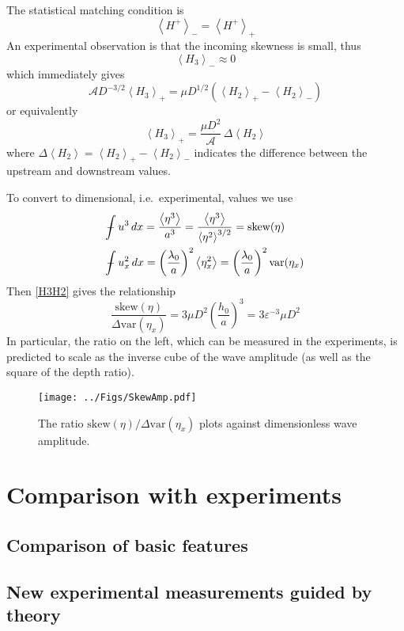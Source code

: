 \documentclass[11pt]{article}
\newcommand{\mean}[1]{\left< #1 \right>}
\newcommand{\eps}{\varepsilon}
\newcommand{\skw}{\text{skew}}
\newcommand{\var}{\text{var}}
\newcommand{\ampp}{\mathcal{A}}
\newcommand{\Ham}{H}
\newcommand{\Hdn}{\Ham^{+}}
\newcommand{\meanup}[1]{\mean{#1}_{-}}
\newcommand{\meandn}[1]{\mean{#1}_{+}}
\def\Xint#1{\mathchoice
   {\XXint\displaystyle\textstyle{#1}}%
   {\XXint\textstyle\scriptstyle{#1}}%
   {\XXint\scriptstyle\scriptscriptstyle{#1}}%
   {\XXint\scriptscriptstyle\scriptscriptstyle{#1}}%
   \!\int}
\def\XXint#1#2#3{{\setbox0=\hbox{$#1{#2#3}{\int}$}
     \vcenter{\hbox{$#2#3$}}\kern-.5\wd0}}
\def\dashint{\Xint-}
\newcommand{\intt}{\dashint}%
\newcommand{\dx}{\, dx}
\begin{document}
The statistical matching condition is
\begin{equation}
\meanup{\Hdn} = \meandn{\Hdn}
\end{equation}
An experimental observation is that the incoming skewness is small, thus
\begin{equation}
\meanup{H_3} \approx 0
\end{equation}
which immediately gives
\begin{equation}
\ampp D^{-3/2} \meandn{H_3} = \mu D^{1/2} \left( \meandn{H_2} - \meanup{H_2} \right)
\end{equation}
or equivalently
\begin{equation}
\label{H3H2}
\meandn{H_3} = \frac{\mu D^{2}}{\ampp} \, \Delta \mean{H_2}
\end{equation}
where $\Delta \mean{H_2} =  \meandn{H_2} - \meanup{H_2}$  indicates the difference between the upstream and downstream values.

To convert to dimensional, i.e.~experimental, values we use
\begin{align}
& \intt u^3 \dx = \frac{\mean{\eta^3}}{a^3} = 
\frac{\mean{\eta^3}}{\mean{\eta^2}^{3/2}} = \skw(\eta) \\
& \intt u_x^2 \dx = \left(\frac{\lambda_0}{a} \right)^2 \mean{\eta_x^2} 
= \left(\frac{\lambda_0}{a} \right)^2 \var(\eta_x)
\end{align}
Then \eqref{H3H2} gives the relationship
\begin{equation}
\frac{\skw(\eta)}{\Delta \var(\eta_x)} =
3 \mu D^2 \left( \frac{h_0}{a} \right)^3 = 3 \eps^{-3} \mu D^2
\end{equation}
In particular, the ratio on the left, which can be measured in the experiments, is predicted to scale as the inverse cube of the wave amplitude (as well as the square of the depth ratio).

\begin{figure}%
\begin{center}
\texttt{[image: ../Figs/SkewAmp.pdf]}
\caption{\label{fig1} 
The ratio ${\skw(\eta)}/{\Delta \var(\eta_x)}$ plots against dimensionless wave amplitude.
}
\end{center}
\end{figure}


\section{Comparison with experiments}

\subsection{Comparison of basic features}

\subsection{New experimental measurements guided by theory}

%
%
\end{document}
